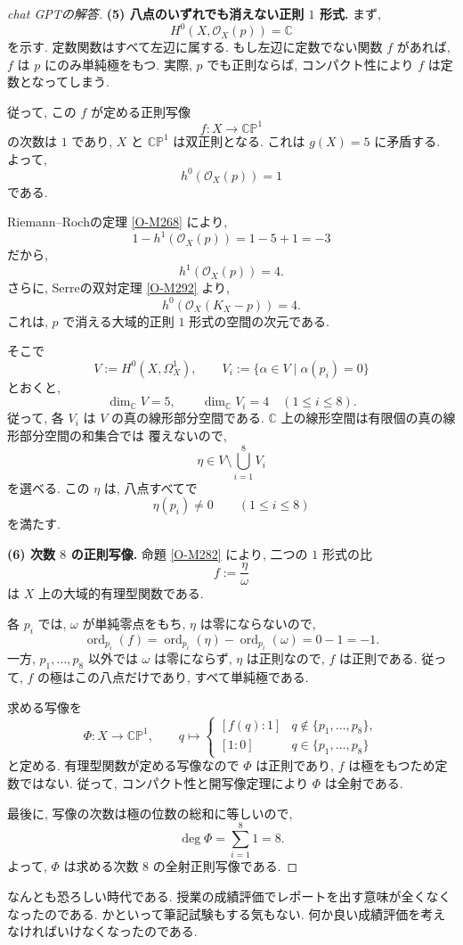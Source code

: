 \documentclass[dvipdfmx,a4paper,11pt]{article} %
\newcommand{\C}{\mathbb{C}}
\theoremstyle{definition}
\numberwithin{equation}{section}
\begin{document}
\begin{proof}[chat GPTの解答]
\medskip
\noindent
\textbf{(5) 八点のいずれでも消えない正則 $1$ 形式.}
まず, 
\[
H^0(X,\mathcal O_X(p))=\mathbb C
\]
を示す.
定数関数はすべて左辺に属する.
もし左辺に定数でない関数 $f$ があれば, 
$f$ は $p$ にのみ単純極をもつ.
実際, $p$ でも正則ならば, 
コンパクト性により $f$ は定数となってしまう.

従って, この $f$ が定める正則写像
\[
f:X\longrightarrow\C\mathbb P^1
\]
の次数は $1$ であり, $X$ と $\C\mathbb P^1$ は双正則となる.
これは $g(X)=5$ に矛盾する.
よって, 
\[
h^0(\mathcal O_X(p))=1
\]
である.

Riemann--Rochの定理 \ref{O-M268} により, 
\[
1-h^1(\mathcal O_X(p))=1-5+1=-3
\]
だから, 
\[
h^1(\mathcal O_X(p))=4.
\]
さらに, Serreの双対定理 \ref{O-M292} より, 
\[
h^0(\mathcal O_X(K_X-p))=4.
\]
これは, $p$ で消える大域的正則 $1$ 形式の空間の次元である.

そこで
\[
V:=H^0(X,\Omega_X^1),\qquad
V_i:=\{\alpha\in V\mid \alpha(p_i)=0\}
\]
とおくと, 
\[
\dim_{\mathbb C}V=5,\qquad
\dim_{\mathbb C}V_i=4
\quad(1\leq i\leq8).
\]
従って, 各 $V_i$ は $V$ の真の線形部分空間である.
$\mathbb C$ 上の線形空間は有限個の真の線形部分空間の和集合では
覆えないので, 
\[
\eta\in V\setminus\bigcup_{i=1}^8V_i
\]
を選べる.
この $\eta$ は, 八点すべてで
\[
\eta(p_i)\neq0
\qquad(1\leq i\leq8)
\]
を満たす.

\medskip
\noindent
\textbf{(6) 次数 $8$ の正則写像.}
命題 \ref{O-M282} により, 
二つの $1$ 形式の比
\[
f:=\frac{\eta}{\omega}
\]
は $X$ 上の大域的有理型関数である.

各 $p_i$ では, $\omega$ が単純零点をもち, 
$\eta$ は零にならないので, 
\[
\operatorname{ord}_{p_i}(f)
=\operatorname{ord}_{p_i}(\eta)
-\operatorname{ord}_{p_i}(\omega)
=0-1=-1.
\]
一方, $p_1,\ldots,p_8$ 以外では $\omega$ は零にならず, 
$\eta$ は正則なので, $f$ は正則である.
従って, $f$ の極はこの八点だけであり, すべて単純極である.

求める写像を
\[
\Phi:X\longrightarrow\C\mathbb P^1,\qquad
q\longmapsto
\begin{cases}
[f(q):1] & q\notin\{p_1,\ldots,p_8\},\\
{}[1:0] & q\in\{p_1,\ldots,p_8\}
\end{cases}
\]
と定める.
有理型関数が定める写像なので $\Phi$ は正則であり, 
$f$ は極をもつため定数ではない.
従って, コンパクト性と開写像定理により $\Phi$ は全射である.

最後に, 写像の次数は極の位数の総和に等しいので, 
\[
\deg\Phi=\sum_{i=1}^8 1=8.
\]
よって, $\Phi$ は求める次数 $8$ の全射正則写像である.
\end{proof}

なんとも恐ろしい時代である. 
授業の成績評価でレポートを出す意味が全くなくなったのである. 
かといって筆記試験もする気もない. 
何か良い成績評価を考えなければいけなくなったのである. 
\end{document}
